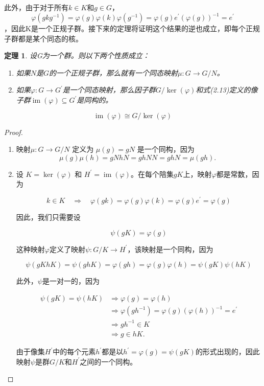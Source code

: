 \documentclass[hyperref,UTF8]{ctexbook}
\newtheorem{theorem}{定理}[chapter]
\begin{document}
此外，由于对于所有$k \in K$和$g \in G$，$$\varphi\left(g k g^{-1}\right)=\varphi(g) \varphi(k) \varphi\left(g^{-1}\right)=\varphi(g) e^{\prime}(\varphi(g))^{-1}=e^{\prime}$$，因此K是一个正规子群。接下来的定理将证明这个结果的逆也成立，即每个正规子群都是某个同态的核。
\begin{theorem}
    设G为一个群。则以下两个性质成立：

\begin{enumerate}
  \item 如果$N$是$G$的一个正规子群，那么就有一个同态映射$\mu: G \rightarrow G / N$。

  \item 如果$\varphi: G \rightarrow G^{\prime}$是一个同态映射，那么因子群$G / \operatorname{ker}(\varphi)$和式(2.13)定义的像子群$\operatorname{im}(\varphi) \subseteq G^{\prime}$是同构的。

\end{enumerate}

$$
\operatorname{im}(\varphi) \cong G / \operatorname{ker}(\varphi)
$$
\end{theorem}
\begin{proof}
    \begin{enumerate}

\item 映射$\mu: G \rightarrow G / N$ 定义为 $\mu(g)=g N$ 是一个同构，因为
$$
\mu(g) \mu(h)=g N h N=g h N N=g h N=\mu(g h) \text {. }
$$

\item 设 $K=\operatorname{ker}(\varphi)$ 和 $H^{\prime}=\operatorname{im}(\varphi)$。在每个陪集$g K$上，映射$\varphi$都是常数，因为

$$
k \in K \quad \Longrightarrow \quad \varphi(g k)=\varphi(g) \varphi(k)=\varphi(g) e^{\prime}=\varphi(g)
$$

因此，我们只需要设

$$
\psi(g K)=\varphi(g)
$$

这种映射$\varphi$定义了映射$\psi: G / K \rightarrow H^{\prime}$，该映射是一个同构，因为

$$
\psi(g K h K)=\psi(g h K)=\varphi(g h)=\varphi(g) \varphi(h)=\psi(g K) \psi(h K)
$$

此外，$\psi$是一对一的，因为

$$
\begin{aligned}
\psi(g K)=\psi(h K) & \Longrightarrow \varphi(g)=\varphi(h) \\
& \Longrightarrow \varphi\left(g h^{-1}\right)=\varphi(g)(\varphi(h))^{-1}=e^{\prime} \\
& \Longrightarrow g h^{-1} \in K \\
& \Longrightarrow g \in h K .
\end{aligned}
$$

由于像集$H^{\prime}$中的每个元素$h^{\prime}$都是以$h^{\prime}=\varphi(g)=\psi(g K)$的形式出现的，因此映射$\psi$是群$G / K$和$H^{\prime}$之间的一个同构。
\end{enumerate}
\end{proof}
\end{document}
